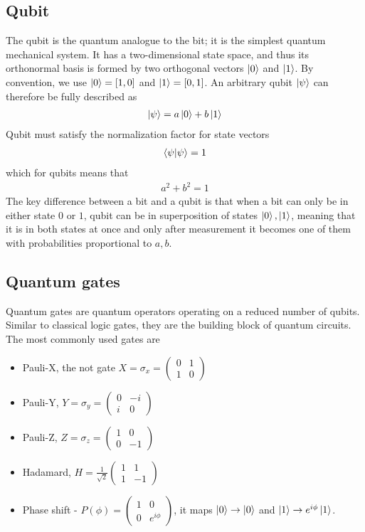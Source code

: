 \subsection{Qubit}
The qubit is the quantum analogue to the bit; it is the simplest quantum mechanical system. It has a two-dimensional state space, and thus its orthonormal basis is formed by two orthogonal vectors $\ket{0}$ and $\ket{1}$. By convention, we use $\ket{0}=[1,0]$ and $\ket{1}=[0,1]$. An arbitrary qubit $\ket{\psi}$ can therefore be fully described as
\begin{align*}
    \ket{\psi}=a\ket{0}+b\ket{1}
\end{align*}
Qubit must satisfy the normalization factor for state vectors
\begin{align*}
    \braket{\psi|\psi}=1
\end{align*}
which for qubits means that
\begin{align*}
    a^2+b^2=1
\end{align*}
The key difference between a bit and a qubit is that when a bit can only be in either state $0$ or $1$, qubit can be in superposition of states $\ket{0}, \ket{1}$, meaning that it is in both states at once and only after measurement it becomes one of them with probabilities proportional to $a,b$.


\subsection{Quantum gates}
Quantum gates are quantum operators operating on a reduced number of qubits. Similar to classical logic gates, they are the building block of quantum circuits. The most commonly used gates are 
\begin{itemize}
  \item Pauli-X, the not gate $X=\sigma_x=\begin{pmatrix}0 & 1 \\ 1 & 0 \end{pmatrix}$
  \item Pauli-Y, $Y=\sigma_y=\begin{pmatrix}0 & -i \\ i & 0 \end{pmatrix}$
  \item Pauli-Z, $Z=\sigma_z=\begin{pmatrix}1 & 0 \\ 0 & -1 \end{pmatrix}$
  \item Hadamard, $H=\frac{1}{\sqrt{2}}\begin{pmatrix}1 & 1 \\ 1 & -1 \end{pmatrix}$
  \item Phase shift - $P(\phi)=\begin{pmatrix}1 & 0 \\ 0 & e^{i\phi} \end{pmatrix}$, it maps $\ket{0}\rightarrow \ket{0}$ and $\ket{1}\rightarrow e^{i\phi}\ket{1}$.
\end{itemize}
